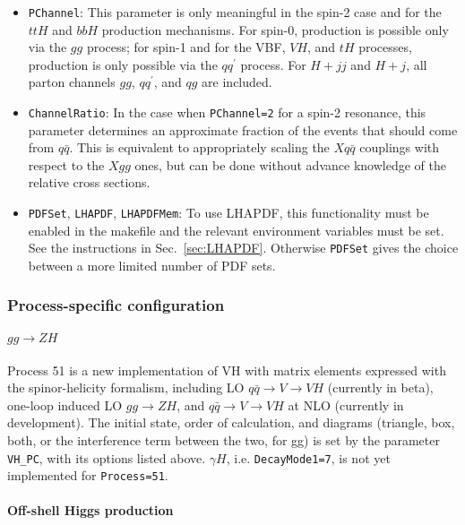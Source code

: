 \documentclass[aps,superscriptaddress,nofootinbib]{revtex4}
\begin{document}
\begin{itemize}
\item \verb|PChannel|: This parameter is only meaningful in the spin-2 case and for the $ttH$ and $bbH$ production mechanisms.  For spin-0, production is possible only via the $gg$ process; for spin-1 and for the VBF, $VH$, and $tH$ processes, production is only possible via the $qq^\prime$ process.  For $H+jj$ and $H+j$, all parton channels $gg$, $qq^\prime$, and $qg$ are included.
\item \verb|ChannelRatio|: In the case when \verb|PChannel=2| for a spin-2 resonance, this parameter determines an approximate fraction of the events that should come from $q\bar{q}$.  This is equivalent to appropriately scaling the $Xq\bar{q}$ couplings with respect to the $Xgg$ ones, but can be done without advance knowledge of the relative cross sections.
\item \verb|PDFSet|, \verb|LHAPDF|, \verb|LHAPDFMem|: To use LHAPDF, this functionality must be enabled in the makefile and the relevant environment variables must be set.  See the instructions in Sec.~\ref{sec:LHAPDF}.  Otherwise \verb|PDFSet| gives the choice between a more limited number of PDF sets.
\end{itemize}

\subsubsection{Process-specific configuration}

\paragraph{\texorpdfstring{$gg\to ZH$}{gg to ZH}}

Process 51 is a new implementation of VH with matrix elements expressed with the spinor-helicity formalism, including LO $q \bar q \to V \to VH$ (currently in beta), one-loop induced LO $gg \to ZH$, and $q \bar q \to V \to VH$ at NLO (currently in development). The initial state, order of calculation, and diagrams (triangle, box, both, or the interference term between the two, for gg) is set by the parameter \texttt{VH\_PC}, with its options listed above. $\gamma H$, i.e. \texttt{DecayMode1=7}, is not yet implemented for \texttt{Process=51}.

\paragraph{Off-shell Higgs production}
\label{sec:offshell}
\end{document}
